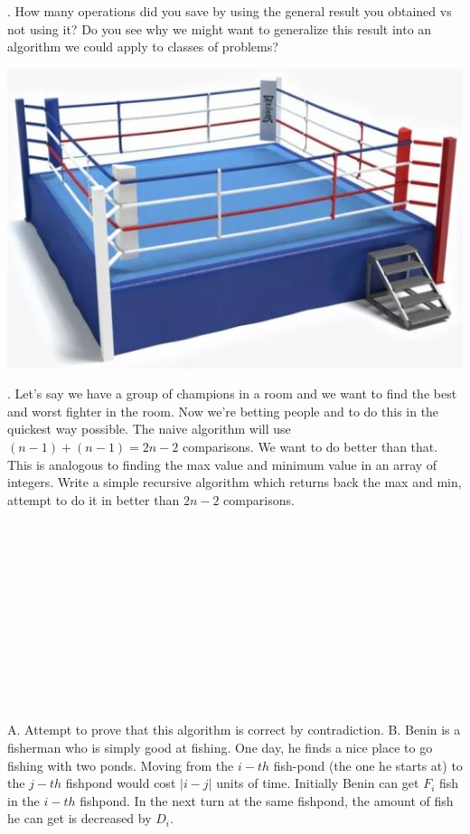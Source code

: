 \documentclass[12pt]{article}
\begin{document}
. How many operations did you save by using the general result you obtained vs not using it? Do you see why we might want to generalize this result into an algorithm we could apply to classes of problems?
\newpage
\centerline{\includegraphics[scale = 0.25]{boxing.jpg}}
. Let's say we have a group of champions in a room and we want to find the best and worst fighter in the room. Now we're betting people and to do this in the quickest way possible. The naive algorithm will use $(n-1) + (n-1) = 2n -2 $ comparisons. We want to do better than that. This is analogous to finding the max value and minimum value in an array of integers. Write a simple recursive algorithm which returns back the max and min, attempt to do it in better than $2n-2$ comparisons.\\\\\\\\\\\\\\\\\\\\\\\\\\
\noindent A. Attempt to prove that this algorithm is correct by contradiction. 
\newpage
\noindent B. Benin is a fisherman who is simply good at fishing. One day, he finds a nice place to go fishing with two ponds. 
Moving from the $i-th$ fish-pond (the one he starts at) to the $j-th$ fishpond would cost $|i - j|$ units of time. 
Initially Benin can get $F_i$ fish in the $i-th$ fishpond. 
In the next turn at the same fishpond, the amount of fish he can get is decreased by $D_i$. 
\end{document}
